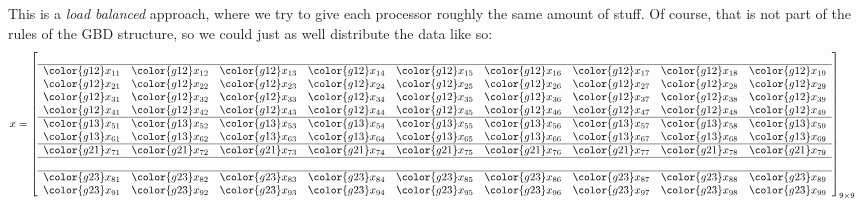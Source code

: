 This is a \emph{load balanced} approach, where we try to give each processor
roughly the same amount of stuff. Of course, that is not part of the
rules of the GBD structure, so we could just as well distribute
the data like so:
\begin{align*}
x &= \left[
      \begin{array}{lllllllll}
      \\\hline
      \color{g12}x_{11} & \color{g12}x_{12} & \color{g12}x_{13} & \color{g12}x_{14} & \color{g12}x_{15} & \color{g12}x_{16} & \color{g12}x_{17} & \color{g12}x_{18} & \color{g12}x_{19}\\
      \color{g12}x_{21} & \color{g12}x_{22} & \color{g12}x_{23} & \color{g12}x_{24} & \color{g12}x_{25} & \color{g12}x_{26} & \color{g12}x_{27} & \color{g12}x_{28} & \color{g12}x_{29}\\
      \color{g12}x_{31} & \color{g12}x_{32} & \color{g12}x_{33} & \color{g12}x_{34} & \color{g12}x_{35} & \color{g12}x_{36} & \color{g12}x_{37} & \color{g12}x_{38} & \color{g12}x_{39}\\
      \color{g12}x_{41} & \color{g12}x_{42} & \color{g12}x_{43} & \color{g12}x_{44} & \color{g12}x_{45} & \color{g12}x_{46} & \color{g12}x_{47} & \color{g12}x_{48} & \color{g12}x_{49}\\\hline
      \color{g13}x_{51} & \color{g13}x_{52} & \color{g13}x_{53} & \color{g13}x_{54} & \color{g13}x_{55} & \color{g13}x_{56} & \color{g13}x_{57} & \color{g13}x_{58} & \color{g13}x_{59}\\
      \color{g13}x_{61} & \color{g13}x_{62} & \color{g13}x_{63} & \color{g13}x_{64} & \color{g13}x_{65} & \color{g13}x_{66} & \color{g13}x_{67} & \color{g13}x_{68} & \color{g13}x_{69}\\\hline
      \color{g21}x_{71} & \color{g21}x_{72} & \color{g21}x_{73} & \color{g21}x_{74} & \color{g21}x_{75} & \color{g21}x_{76} & \color{g21}x_{77} & \color{g21}x_{78} & \color{g21}x_{79}\\\hline\\\hline
      \color{g23}x_{81} & \color{g23}x_{82} & \color{g23}x_{83} & \color{g23}x_{84} & \color{g23}x_{85} & \color{g23}x_{86} & \color{g23}x_{87} & \color{g23}x_{88} & \color{g23}x_{89}\\
      \color{g23}x_{91} & \color{g23}x_{92} & \color{g23}x_{93} & \color{g23}x_{94} & \color{g23}x_{95} & \color{g23}x_{96} & \color{g23}x_{97} & \color{g23}x_{98} & \color{g23}x_{99}\\
      \end{array}
\right]_{9\times 9}
\end{align*}
